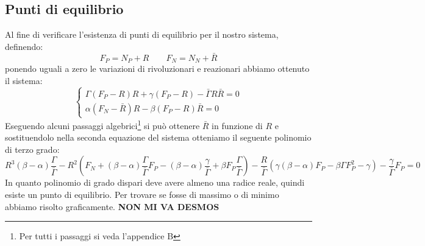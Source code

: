 \subsection{Punti di equilibrio}
Al fine di verificare l'esistenza di punti di equilibrio per il nostro sistema, definendo:
\begin{equation}
	F_{P}=N_{P}+R \qquad F_{N}=N_{N}+\bar{R}
\end{equation}
ponendo uguali a zero le variazioni di rivoluzionari e reazionari abbiamo ottenuto il sistema:
\begin{equation}
	\begin{cases}
		\Gamma (F_{P}-R)R+\gamma (F_{P}-R)-\bar{\Gamma}R\bar{R}=0\\
		\alpha (F_{N}-\bar{R})R-\beta (F_{P}-R)\bar{R}=0
	\end{cases}
\end{equation}
Eseguendo alcuni passaggi algebrici\footnote{Per tutti i passaggi si veda l'appendice B} si può ottenere $ \bar{R} $ in funzione di $ R $ e sostituendolo nella seconda equazione del sistema otteniamo il seguente polinomio di terzo grado:
\begin{equation}
	R^{3}(\beta - \alpha)\frac{\Gamma}{\bar{\Gamma}}-R^{2}\left(F_{N}+(\beta - \alpha)\frac{\Gamma}{\bar{\Gamma}}F_{P}-(\beta - \alpha)\frac{\gamma}{\bar{\Gamma}}+\beta F_{P}\frac{\Gamma}{\bar{\Gamma}}\right)-\frac{R}{\bar{\Gamma}}\left(\gamma (\beta - \alpha)F_{P}-\beta \Gamma F^{2}_{P}-\gamma\right)-\frac{\gamma}{\bar{\Gamma}}F_{P}=0
\end{equation}
In quanto polinomio di grado dispari deve avere almeno una radice reale, quindi esiste un punto di equilibrio. Per trovare se fosse di massimo o di minimo abbiamo risolto graficamente. \textbf{NON MI VA DESMOS}
